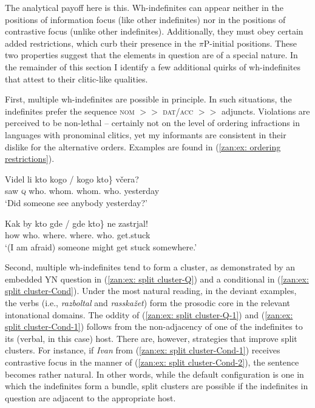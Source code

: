 \documentclass[output=paper,colorlinks,citecolor=brown]{langscibook}
\begin{document}
\z
\z

\noindent The analytical payoff here is this. Wh-indefinites can appear neither in the positions of information focus (like other indefinites) nor in the positions of contrastive focus (unlike other indefinites). Additionally, they must obey certain added restrictions, which curb their presence in the $\pi$P-initial positions. These two properties suggest that the elements in question are of a special nature. In the remainder of this section I identify a few additional quirks of wh-indefinites that attest to their clitic-like qualities.

First, multiple wh-indefinites are possible in principle. In such situations, the indefinites prefer the sequence \textsc{nom} $>>$ \textsc{dat/acc} $>>$ adjuncts. Violations are perceived to be non-lethal -- certainly not on the level of ordering infractions in languages with pronominal clitics, yet my informants are consistent in their dislike for the alternative orders. Examples are found in (\ref{zan:ex: ordering restrictions}).

\ea \label{zan:ex: ordering restrictions}
\ea 
        \gll Videl li \minsp{\{} kto kogo /  kogo kto\} včera? \\
        saw \textsc{q} {} who.{\INDF} whom.{\INDF} {} {} whom.{\INDF} who.{\INDF} yesterday  \\
        \glt `Did someone see anybody yesterday?'

\ex 
        \gll Kak by \minsp{\{} kto gde /  gde kto\} ne zastrjal!\\
 how {\SBJV} {} who.{\INDF} where.{\INDF} {} {} where.{\INDF} who.{\INDF} {\NEG} get.stuck  \\
   \glt `(I am afraid) someone might get stuck somewhere.'
   
\z
\z

\noindent Second, multiple wh-indefinites tend to form a cluster, as demonstrated by an embedded YN question in (\ref{zan:ex: split cluster-Q}) and a conditional in (\ref{zan:ex: split cluster-Cond}). Under the most natural reading, in the deviant examples, the verbs (i.e., \textit{razboltal} and \textit{rasskažet}) form the  prosodic core in the relevant intonational domains. The oddity of (\ref{zan:ex: split cluster-Q-1}) and (\ref{zan:ex: split cluster-Cond-1}) follows from the non-adjacency of one of the indefinites to its (verbal, in this case) host. There are, however, strategies that improve split clusters. For instance, if \textit{Ivan} from (\ref{zan:ex: split cluster-Cond-1}) receives contrastive focus in the manner of (\ref{zan:ex: split cluster-Cond-2}), the sentence becomes rather natural. In other words, while the default configuration is one in which the indefinites form a bundle, split clusters are possible if the indefinites in question are adjacent to the appropriate host.
\end{document}
